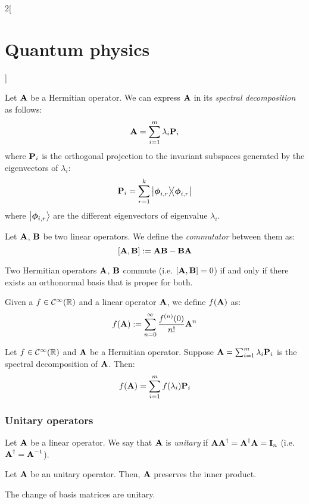 \documentclass[../../../main.tex]{subfiles}
\begin{document}
\begin{multicols}{2}[\section{Quantum physics}]
\begin{definition}
  \end{definition}
  \begin{proposition}
    Let $\boldsymbol{\mathrm{A}}$ be a Hermitian operator. We can express $\boldsymbol{\mathrm{A}}$ in its \emph{spectral decomposition} as follows: $$\boldsymbol{\mathrm{A}}=\sum_{i=1}^m\lambda_i\boldsymbol{\mathrm{P}}_i$$
    where $\boldsymbol{\mathrm{P}}_i$ is the orthogonal projection to the invariant subspaces generated by the eigenvectors of $\lambda_i$: $$\vf{P}_i=\sum_{r=1}^k\dyad{\vf\phi_{i,r}}{\vf\phi_{i,r}}$$
    where $\ket{\boldsymbol{\mathrm{\phi}}_{i,r}}$ are the different eigenvectors of eigenvalue $\lambda_i$.
  \end{proposition}
  \begin{definition}[Commutator]
    Let $\boldsymbol{\mathrm{A}}$, $\boldsymbol{\mathrm{B}}$ be two linear operators. We define the \emph{commutator} between them as: $$[\boldsymbol{\mathrm{A}},\boldsymbol{\mathrm{B}}]:=\boldsymbol{\mathrm{AB}}-\boldsymbol{\mathrm{BA}}$$
  \end{definition}
  \begin{theorem}
    Two Hermitian operators $\boldsymbol{\mathrm{A}}$, $\boldsymbol{\mathrm{B}}$ commute (i.e. $[\boldsymbol{\mathrm{A}},\boldsymbol{\mathrm{B}}]=0$) if and only if there exists an orthonormal basis that is proper for both.
  \end{theorem}
  \begin{definition}
    Given a $f\in\mathcal{C}^\infty(\mathbb{R})$ and a linear operator $\boldsymbol{\mathrm{A}}$, we define $f(\boldsymbol{\mathrm{A}})$ as: $$f(\boldsymbol{\mathrm{A}}):=\sum_{n=0}^\infty \frac{f^{(n)}(0)}{n!}\boldsymbol{\mathrm{A}}^n$$
  \end{definition}
  \begin{proposition}
    Let $f\in\mathcal{C}^\infty(\mathbb{R})$ and $\boldsymbol{\mathrm{A}}$ be a Hermitian operator. Suppose $\boldsymbol{\mathrm{A}}=\sum_{i=1}^m\lambda_i\boldsymbol{\mathrm{P}}_i$ is the spectral decomposition of $\boldsymbol{\mathrm{A}}$. Then: $$f(\boldsymbol{\mathrm{A}})=\sum_{i=1}^mf(\lambda_i)\boldsymbol{\mathrm{P}}_i$$
  \end{proposition}
  \subsubsection{Unitary operators}
  \begin{definition}
    Let $\boldsymbol{\mathrm{A}}$ be a linear operator. We say that $\boldsymbol{\mathrm{A}}$ is \emph{unitary} if $\boldsymbol{\mathrm{A}}\boldsymbol{\mathrm{A}}^\dag=\boldsymbol{\mathrm{A}}^\dag\boldsymbol{\mathrm{A}}=\boldsymbol{\mathrm{I}}_n$ (i.e. $\boldsymbol{\mathrm{A}}^\dag=\boldsymbol{\mathrm{A}}^{-1}$).
  \end{definition}
  \begin{proposition}
    Let $\boldsymbol{\mathrm{A}}$ be an unitary operator. Then, $\boldsymbol{\mathrm{A}}$ preserves the inner product.
  \end{proposition}
  \begin{proposition}
    The change of basis matrices are unitary.
  \end{proposition}

\end{multicols}
\end{document}
